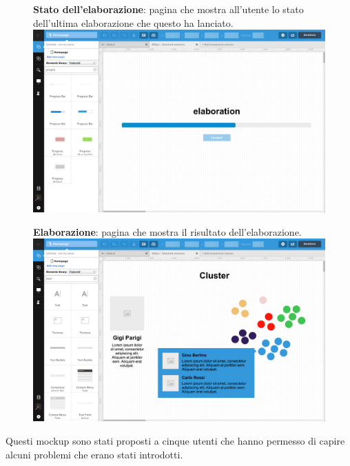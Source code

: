         	\begin{figure}[p]
		\textbf{Stato dell'elaborazione}: pagina che mostra all'utente lo stato dell'ultima elaborazione che questo ha lanciato.\\

        		\includegraphics[width=\textwidth]{img/mockup/process.png}
        	\end{figure}

        	\begin{figure}[p]
		\textbf{Elaborazione}: pagina che mostra il risultato dell'elaborazione.\\

        		\includegraphics[width=\textwidth]{img/mockup/elaboration.png}
        	\end{figure}
            
	\newpage
         Questi mockup sono stati proposti a cinque utenti che hanno permesso di capire alcuni problemi che erano stati introdotti.
            
